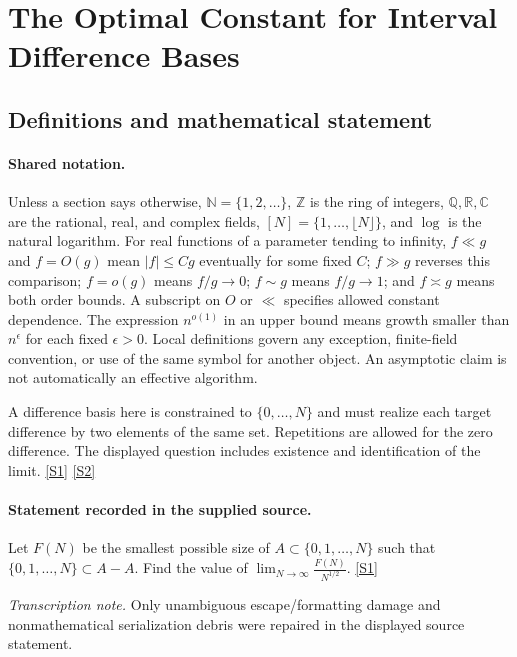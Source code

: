 \documentclass[11pt,a4paper]{article}
\newcommand{\N}{\mathbb{N}}
\newcommand{\Z}{\mathbb{Z}}
\newcommand{\Q}{\mathbb{Q}}
\newcommand{\R}{\mathbb{R}}
\newcommand{\C}{\mathbb{C}}
\newcommand{\sref}[2]{\hyperlink{source:#1:#2}{[S#2]}}
\begin{document}
\section{The Optimal Constant for Interval Difference Bases}\label{statement}


\subsection{Definitions and mathematical statement}

\paragraph{Shared notation.}Unless a section says otherwise, $\N=\{1,2,\ldots\}$,
$\Z$ is the ring of integers, $\Q,\R,\C$ are the rational, real, and complex
fields, $[N]=\{1,\ldots,\lfloor N\rfloor\}$, and $\log$ is the natural
logarithm. For real functions of a parameter tending to infinity,
$f\ll g$ and $f=O(g)$ mean $|f|\leq Cg$ eventually for some fixed $C$;
$f\gg g$ reverses this comparison; $f=o(g)$ means $f/g\to0$;
$f\sim g$ means $f/g\to1$; and $f\asymp g$ means both order bounds.
A subscript on $O$ or $\ll$ specifies allowed constant dependence.
The expression $n^{o(1)}$ in an upper bound means growth smaller than
$n^\epsilon$ for each fixed $\epsilon>0$. Local definitions govern any
exception, finite-field convention, or use of the same symbol for another
object. An asymptotic claim is not automatically an effective algorithm.



A difference basis here is constrained to $\{0,\ldots,N\}$ and must realize each target difference by two elements of the same set. Repetitions are allowed for the zero difference. The displayed question includes existence and identification of the limit. \sref{statement}{1} \sref{statement}{2}

\paragraph{Statement recorded in the supplied source.}
Let $F(N)$ be the smallest possible size of $A\subset \{0,1,\ldots,N\}$ such that $\{0,1,\ldots,N\}\subset A-A$. Find the value of $ \lim_{N\to \infty}\frac{F(N)}{N^{1/2}}. $ \sref{statement}{1}

{\small\emph{Transcription note.} Only unambiguous escape/formatting damage and nonmathematical serialization debris were repaired in the displayed source statement.}
\end{document}
